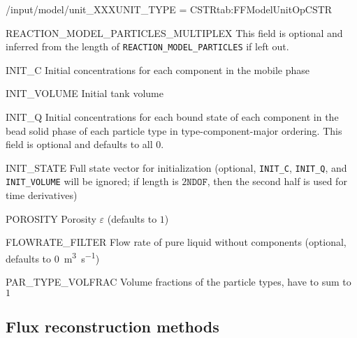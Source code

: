\begin{condsubgroup}{/input/model/unit\_XXX}{UNIT\_TYPE = CSTR}{tab:FFModelUnitOpCSTR}
\begin{dataset}[unit=--,type=int,range={$\{0, 1\}$},length={1}]{REACTION\_MODEL\_PARTICLES\_MULTIPLEX}
    This field is optional and inferred from the length of \texttt{REACTION\_MODEL\_PARTICLES} if left out.
  \end{dataset}
  \begin{dataset}[unit=\si{\mol\per\cubic\metre\of{IV}},type=double,range={$\geq 0$},length={\texttt{NCOMP}}]{INIT\_C}
    Initial concentrations for each component in the mobile phase
  \end{dataset}
  \begin{dataset}[unit=\si{\cubic\metre},type=double,range={$\geq 0$},length=1]{INIT\_VOLUME}
    Initial tank volume
  \end{dataset}
  \begin{dataset}[unit=\si{\mol\per\cubic\metre\of{SP}},type=double,range={$\geq 0$},length={\texttt{NTOTALBND}}]{INIT\_Q}
    Initial concentrations for each bound state of each component in the bead solid phase of each particle type in type-component-major ordering.
    This field is optional and defaults to all $0$.
  \end{dataset}
  \begin{dataset}[unit=various,type=double,range={$\mathds{R}$},length={\texttt{NDOF} / $2\texttt{NDOF}$}]{INIT\_STATE}
    Full state vector for initialization (optional, \texttt{INIT\_C}, \texttt{INIT\_Q}, and \texttt{INIT\_VOLUME} will be ignored; if length is $2\texttt{NDOF}$, then the second half is used for time derivatives)
  \end{dataset}
  \begin{dataset}[unit=--,type=double,range={$(0,1]$},length={1}]{POROSITY}
    Porosity $\varepsilon$ (defaults to $1$)
  \end{dataset}
  \begin{dataset}[unit=\si{\cubic\metre\per\second},type=double,range={$\geq 0$},length={$1$ / \texttt{NSEC}}]{FLOWRATE\_FILTER}
    Flow rate of pure liquid without components (optional, defaults to \SI{0}{\cubic\metre\per\second})
  \end{dataset}
  \begin{dataset}[unit=--,type=double,range={$[0,1]$},length={\texttt{NPARTYPE}}]{PAR\_TYPE\_VOLFRAC}
    Volume fractions of the particle types, have to sum to $1$
  \end{dataset}
\end{condsubgroup}

\subsection{Flux reconstruction methods}

